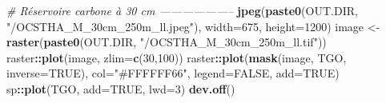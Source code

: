 \documentclass[a4paper, notitlepage, 12pt, krantz2]{krantz}
\newenvironment{Shaded}{\begin{snugshade}}{\end{snugshade}}
\newcommand{\CommentTok}[1]{\textcolor[rgb]{0.56,0.35,0.01}{\textit{#1}}}
\newcommand{\DataTypeTok}[1]{\textcolor[rgb]{0.13,0.29,0.53}{#1}}
\newcommand{\DecValTok}[1]{\textcolor[rgb]{0.00,0.00,0.81}{#1}}
\newcommand{\KeywordTok}[1]{\textcolor[rgb]{0.13,0.29,0.53}{\textbf{#1}}}
\newcommand{\NormalTok}[1]{#1}
\newcommand{\OperatorTok}[1]{\textcolor[rgb]{0.81,0.36,0.00}{\textbf{#1}}}
\newcommand{\OtherTok}[1]{\textcolor[rgb]{0.56,0.35,0.01}{#1}}
\newcommand{\StringTok}[1]{\textcolor[rgb]{0.31,0.60,0.02}{#1}}
\begin{document}
\begin{Shaded}
\begin{Highlighting}[]
{\CommentTok{# Réservoire carbone à 30 cm --------------------}
\KeywordTok{jpeg}\NormalTok{(}\KeywordTok{paste0}\NormalTok{(OUT.DIR, }\StringTok{"/OCSTHA_M_30cm_250m_ll.jpeg"}\NormalTok{), }\DataTypeTok{width=}\DecValTok{675}\NormalTok{, }\DataTypeTok{height=}\DecValTok{1200}\NormalTok{)}
\NormalTok{image <-}\StringTok{ }\KeywordTok{raster}\NormalTok{(}\KeywordTok{paste0}\NormalTok{(OUT.DIR, }\StringTok{"/OCSTHA_M_30cm_250m_ll.tif"}\NormalTok{))}
\NormalTok{raster}\OperatorTok{::}\KeywordTok{plot}\NormalTok{(image, }\DataTypeTok{zlim=}\KeywordTok{c}\NormalTok{(}\DecValTok{30}\NormalTok{,}\DecValTok{100}\NormalTok{))}
\NormalTok{raster}\OperatorTok{::}\KeywordTok{plot}\NormalTok{(}\KeywordTok{mask}\NormalTok{(image, TGO, }\DataTypeTok{inverse=}\OtherTok{TRUE}\NormalTok{), }\DataTypeTok{col=}\StringTok{"#FFFFFF66"}\NormalTok{, }\DataTypeTok{legend=}\OtherTok{FALSE}\NormalTok{, }\DataTypeTok{add=}\OtherTok{TRUE}\NormalTok{)}
\NormalTok{sp}\OperatorTok{::}\KeywordTok{plot}\NormalTok{(TGO, }\DataTypeTok{add=}\OtherTok{TRUE}\NormalTok{, }\DataTypeTok{lwd=}\DecValTok{3}\NormalTok{)}
\KeywordTok{dev.off}\NormalTok{()}


}
\end{Highlighting}
\end{Shaded}
\end{document}
